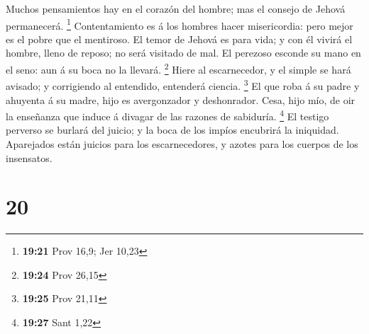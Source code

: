 Muchos pensamientos hay en el corazón del hombre; mas el consejo de
Jehová permanecerá. \footnote{\textbf{19:21} Prov 16,9; Jer 10,23}
 Contentamiento es á los hombres hacer misericordia: pero
mejor es el pobre que el mentiroso.  El temor de Jehová
es para vida; y con él vivirá el hombre, lleno de reposo; no será
visitado de mal.  El perezoso esconde su mano en el seno:
aun á su boca no la llevará. \footnote{\textbf{19:24} Prov 26,15}
 Hiere al escarnecedor, y el simple se hará avisado; y
corrigiendo al entendido, entenderá ciencia. \footnote{\textbf{19:25}
  Prov 21,11}  El que roba á su padre y ahuyenta á su
madre, hijo es avergonzador y deshonrador.  Cesa, hijo
mío, de oir la enseñanza que induce á divagar de las razones de
sabiduría. \footnote{\textbf{19:27} Sant 1,22}  El
testigo perverso se burlará del juicio; y la boca de los impíos
encubrirá la iniquidad.  Aparejados están juicios para
los escarnecedores, y azotes para los cuerpos de los insensatos.

\hypertarget{section-19}{%
\section{20}\label{section-19}}

